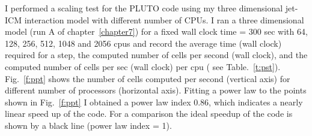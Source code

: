 
I performed a scaling test for the PLUTO code using my three dimensional jet-ICM interaction model with different number of CPUs. I ran a three dimensional model (run A of chapter~\ref{chapter7}) for a fixed wall clock time = 300 sec with 64, 128, 256, 512, 1048 and 2056 cpus and record the average time (wall clock) required for a step, the computed number of cells per second (wall clock), and the computed number of cells per sec (wall clock) per cpu ( see Table.~\ref{t:pst}). Fig.~\ref{f:ppt} shows the number of cells computed per second (vertical axis) for different number of processors (horizontal axis). Fitting a power law to the points shown in Fig.~\ref{f:ppt} I obtained a power law index 0.86, which indicates a nearly linear speed up of the code. For a comparison the ideal speedup of the code is shown by a black line (power law index = 1). 



